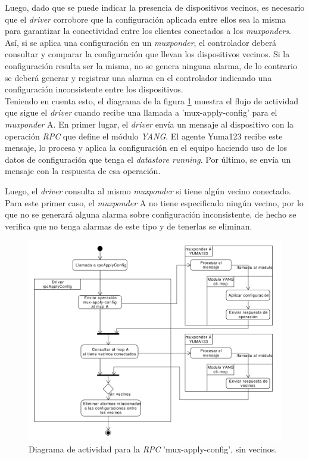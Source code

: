   Luego, dado que se puede indicar la presencia de dispositivos vecinos, es necesario que el \textit{driver} corrobore que la configuración aplicada entre ellos sea la misma para garantizar la conectividad entre los clientes conectados a los \textit{muxponders}. Así, si se aplica una configuración en un \textit{muxponder}, el controlador deberá consultar y comparar la configuración que llevan los dispositivos vecinos. Si la configuración resulta ser la misma, no se genera ninguna alarma, de lo contrario se deberá generar y registrar una alarma en el controlador indicando una configuración inconsistente entre los dispositivos.
  \\

  Teniendo en cuenta esto, el diagrama de la figura \ref{fig:actividad_driver_rpc_sin_vecinos} muestra el flujo de actividad que sigue el \textit{driver} cuando recibe una llamada a 'mux-apply-config' para el \textit{muxponder} A. 
  En primer lugar, el \textit{driver} envía un mensaje al dispositivo con la operación \textit{RPC} que define el módulo \textit{YANG}. El agente Yuma123 recibe este mensaje, lo procesa y aplica la configuración en el equipo haciendo uso de los datos de configuración que tenga el \textit{datastore running}. Por último, se envía un mensaje con la respuesta de esa operación.  

  Luego, el \textit{driver} consulta al mismo \textit{muxponder} si tiene algún vecino conectado. Para este primer caso, el \textit{muxponder} A no tiene especificado ningún vecino, por lo que no se generará alguna alarma sobre configuración inconsistente, de hecho se verifica que no tenga alarmas de este tipo y de tenerlas se eliminan.


  \begin{figure}[H]
    \centering
    \includegraphics[scale=0.45]{Figures/actividad_driver_rpc_sin_vecinos.pdf}
    \caption{Diagrama de actividad para la \textit{RPC} 'mux-apply-config', sin vecinos.}
    \label{fig:actividad_driver_rpc_sin_vecinos}
  \end{figure}

